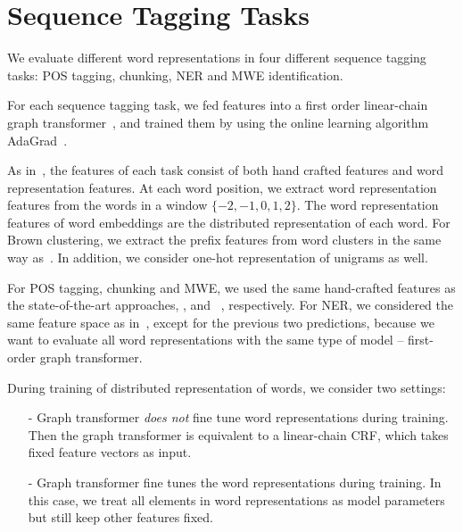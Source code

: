 \section{Sequence Tagging Tasks}
\label{sec:SeqTagging}
We evaluate different word representations in four different sequence tagging tasks: POS tagging, chunking, NER and MWE identification. 

For each sequence tagging task, we fed features into a first order linear-chain graph
transformer~\cite{collobert2011natural}, and trained them by using the online learning algorithm
AdaGrad~\cite{duchi2011adaptive}.

As in~\cite{turian2010word}, the features of each task consist of both hand crafted features and word representation features. At each word position, we extract word representation features from the words in a window $\{-2, -1, 0, 1, 2\}$. The word representation features of word embeddings are the distributed representation of each word.  For Brown clustering, we extract the prefix features from word clusters in the same way as~\cite{turian2010word}. In addition, we consider one-hot representation of unigrams as well.

For POS tagging, chunking and MWE, we used the same hand-crafted features as the state-of-the-art approaches,  ,  and ~, respectively. For NER, we considered the same feature space as in~\cite{turian2010word}, except for the previous two predictions, because we want to evaluate all word representations with the same type of model -- first-order graph transformer.

During training of distributed representation of words, we consider two settings: 

\begin{small}
\begin{itemize}
\item[-] Graph transformer \textit{does not} fine tune word representations during training. Then the graph transformer is equivalent to a linear-chain CRF, which takes fixed feature vectors as input.
\item[-] Graph transformer fine tunes the word representations during training. In this case, we treat all elements in word representations as model parameters but still keep other features fixed.
\end{itemize}
\end{small}

